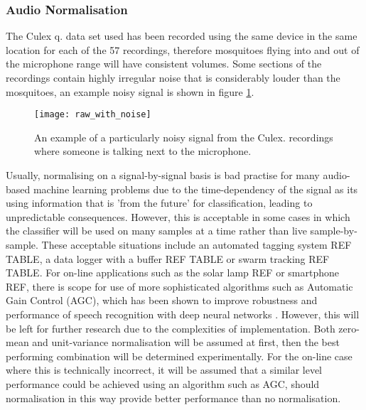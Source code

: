        \subsubsection{Audio Normalisation}
        \label{subsubsec:exp-clf-ass-aud}
            The Culex q. data set used has been recorded using the same device in the same location for each of the 57 recordings, therefore mosquitoes flying into and out of the microphone range will have consistent volumes. Some sections of the recordings contain highly irregular noise that is considerably louder than the mosquitoes, an example noisy signal is shown in figure \ref{fig:exp-clf-audio-noisy}.
            \begin{figure}[ht]
                \centering
                \texttt{[image: raw\_with\_noise]}
                \caption{An example of a particularly noisy signal from the Culex. recordings where someone is talking next to the microphone.}
                \label{fig:exp-clf-audio-noisy}
            \end{figure}
            Usually, normalising on a signal-by-signal basis is bad practise for many audio-based machine learning problems due to the time-dependency of the signal as its using information that is 'from the future' for classification, leading to unpredictable consequences. However, this is acceptable in some cases in which the classifier will be used on many samples at a time rather than live sample-by-sample. These acceptable situations include an automated tagging system REF TABLE, a data logger with a buffer REF TABLE or swarm tracking REF TABLE. For on-line applications such as the solar lamp REF or smartphone REF, there is scope for use of more sophisticated algorithms such as Automatic Gain Control (AGC), which has been shown to improve robustness and performance of speech recognition with deep neural networks \cite{Prabhavalkar2015}. However, this will be left for further research due to the complexities of implementation. Both zero-mean and unit-variance normalisation will be assumed at first, then the best performing combination will be determined experimentally. For the on-line case where this is technically incorrect, it will be assumed that a similar level performance could be achieved using an algorithm such as AGC, should normalisation in this way provide better performance than no normalisation. 

